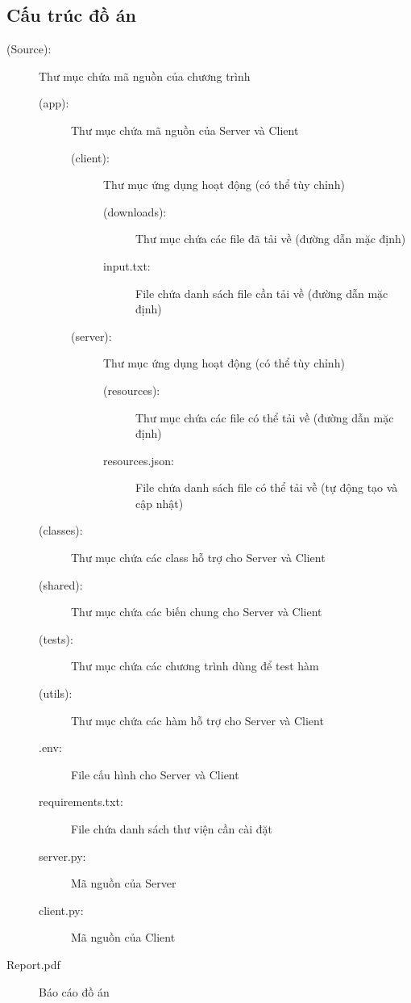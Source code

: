 \documentclass[a4paper,12pt]{report}
\begin{document}
\subsection{Cấu trúc đồ án}
\begin{flushleft}
  \begin{description}
    \item[(Source):]
          Thư mục chứa mã nguồn của chương trình\\
          \begin{description}
            \item[(app):]
                  Thư mục chứa mã nguồn của Server và Client
                  \begin{description}
                    \item[(client):]
                          Thư mục ứng dụng hoạt động (có thể tùy chỉnh)\\
                          \begin{description}
                            \item[(downloads):] Thư mục chứa các file đã tải về (đường dẫn mặc định)
                            \item[input.txt:] File chứa danh sách file cần tải về (đường dẫn mặc định)
                          \end{description}
                    \item[(server):]
                          Thư mục ứng dụng hoạt động (có thể tùy chỉnh)\\
                          \begin{description}
                            \item[(resources):] Thư mục chứa các file có thể tải về (đường dẫn mặc định)
                            \item[resources.json:] File chứa danh sách file có thể tải về (tự động tạo và cập nhật)
                          \end{description}
                  \end{description}
            \item[(classes):] Thư mục chứa các class hỗ trợ cho Server và Client
            \item[(shared):] Thư mục chứa các biến chung cho Server và Client
            \item[(tests):] Thư mục chứa các chương trình dùng để test hàm
            \item[(utils):] Thư mục chứa các hàm hỗ trợ cho Server và Client
            \item[.env:] File cấu hình cho Server và Client
            \item[requirements.txt:] File chứa danh sách thư viện cần cài đặt
            \item[server.py:] Mã nguồn của Server
            \item[client.py:] Mã nguồn của Client
          \end{description}
    \item[Report.pdf] Báo cáo đồ án
  \end{description}
\end{flushleft}
\end{document}

